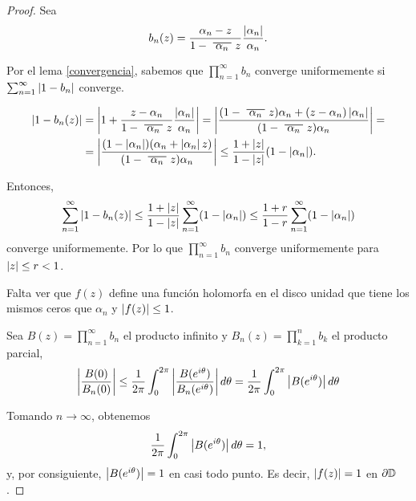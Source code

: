 \begin{proof}
    Sea
    \begin{equation*}
        b_n (z) = \frac{\alpha_n - z}{1 - \xbar{\alpha_n}z} \dfrac{\abs{\alpha_n}}{\alpha_n}.
    \end{equation*}

    Por el lema \ref{convergencia}, sabemos que $\prod_{n=1}^{\infty} b_n$ converge uniformemente si $\sum_{n=1}^{\infty} \left\lvert1 - b_n\right\rvert$ converge.

    \begin{equation*}
        \begin{split}
            \abs{1 - b_n(z)} & = \abs{1 + \dfrac{z - \alpha_n}{1 - \xbar{\alpha_n}z} \dfrac{\abs{\alpha_n}}{\alpha_n}} = \abs{\dfrac{(1 - \xbar{\alpha_n}z) \alpha_n + (z - \alpha_n) \abs{\alpha_n}}{(1 - \xbar{\alpha_n}z) \alpha_n}} = \\
                             & = \abs{ \dfrac{(1 - \abs{\alpha_n}) (\alpha_n + \abs{\alpha_n} z)}{(1 - \xbar{\alpha_n}z) \alpha_n}} \leq \dfrac{1 + \abs{z}}{1 - \abs{z}} (1 - \abs{\alpha_n}).
        \end{split}
    \end{equation*}

    Entonces,
    \begin{equation*}
        \sum_{n=1}^{\infty} \abs{1 - b_n(z)} \leq \dfrac{1 + \abs{z}}{1 - \abs{z}} \sum_{n=1}^{\infty} (1 - \abs{\alpha_n}) \leq \dfrac{1 + r}{1 - r} \sum_{n=1}^{\infty} (1 - \abs{\alpha_n})          %
    \end{equation*}
    converge uniformemente. Por lo que $\prod_{n=1}^{\infty} b_n$ converge uniformemente para $\left\lvert z\right\rvert \leq r < 1$.

    Falta ver que $f(z)$ define una función holomorfa en el disco unidad que tiene los mismos ceros que $\alpha_n$ y $\left\lvert f(z)\right\rvert \leq 1$.

    Sea $B(z) = \prod_{n=1}^{\infty} b_n$ el producto infinito y $B_n(z) = \prod_{k=1}^{n} b_k$ el producto parcial,
    \begin{equation*}
        \left\lvert\frac{B(0)}{B_n(0)}\right\rvert \leq \frac{1}{2 \pi} \int_{0}^{2 \pi} \left\lvert\frac{B(e^{i \theta})}{B_n(e^{i \theta})}\right\rvert d \theta = \frac{1}{2 \pi}  \int_{0}^{2 \pi} \left\lvert B(e^{i \theta})\right\rvert d \theta
    \end{equation*}

    Tomando $n \rightarrow \infty$, obtenemos
    \begin{equation*}
         \frac{1}{2 \pi}  \int_{0}^{2 \pi} \left\lvert B(e^{i \theta})\right\rvert d \theta = 1,
    \end{equation*}
    y, por consiguiente, $\left\lvert B(e^{i \theta})\right\rvert = 1$ en casi todo punto. Es decir, $\left\lvert f(z)\right\rvert = 1$ en $\partial \mathbb{D}$.
\end{proof}

